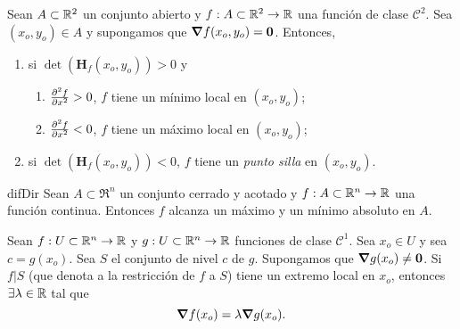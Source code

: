 \begin{theorem} \label{teo:derivada_2da}
\mbox{}

 Sean $A \subset \mathbb{R}^2$ un conjunto abierto y $f: A \subset \mathbb{R}^2 \to \mathbb{R}$ una funci\'on de clase $\mathcal{C}^2$. Sea $(x_o,y_o) \in A$ y supongamos que $\grad f(x_o,y_o) = \mathbf{0}$. Entonces,  
 \begin{enumerate} %
    \item si $\det(\mathbf{H}_f (x_o,y_o)) > 0$ y
    \begin{enumerate} %
        \item $\pdv[2]{f}{x} (x_o,y_o) > 0$, $f$ tiene un m\'inimo local en $(x_o,y_o)$;
        \item $\pdv[2]{f}{x} (x_o,y_o) < 0$, $f$ tiene un m\'aximo local en $(x_o,y_o)$;
    \end{enumerate}
    \item si $\det(\mathbf{H}_f (x_o,y_o)) < 0$, $f$ tiene un \emph{punto silla} en $(x_o,y_o)$.
 \end{enumerate}

\end{theorem}

\begin{theorem} \label{teo:weier}difDir
  Sean $A \subset \Re^n$ un conjunto cerrado y acotado y $f: A \subset \mathbb {R}^n \to \mathbb{R}$ una funci\'on continua. Entonces $f$ alcanza un m\'aximo y un m\'inimo absoluto en $A$.
\end{theorem}

\begin{theorem}  \label{teo:lagrange}
    Sean $f:U \subset \mathbb {R}^n \to \mathbb{R}$ y $g:U \subset \mathbb {R}^n \to \mathbb{R}$ funciones de clase $\mathcal{C}^1$. Sea $x_o \in U$ y sea $c = g(x_o)$. Sea $S$ el conjunto de nivel $c$ de $g$. Supongamos que $\grad g (x_o) \ne \mathbf{0}$. Si $f|S$ (que denota a la restricci\'on de $f$ a $S$) tiene un extremo local en $x_o$, entonces $\exists \lambda \in \mathbb{R}$ tal que
    \[
     \grad f (x_o) = \lambda \grad g (x_o).
    \]
\end{theorem}
